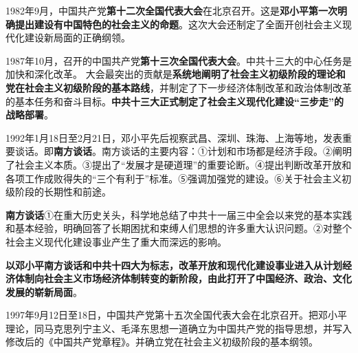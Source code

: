 1982年9月，中国共产党\textbf{第十二次全国代表大会}在北京召开。这是\textbf{邓小平第一次明确提出建设有中国特色的社会主义的命题}。这次大会还制定了全面开创社会主义现代化建设新局面的正确纲领。

1987年10月，召开的中国共产党\textbf{第十三次全国代表大会}。中共十三大的中心任务是加快和深化改革。
大会最突出的贡献是\textbf{系统地阐明了社会主义初级阶段的理论和党在社会主义初级阶段的基本路线}，并制定了下一步经济体制改革和政治体制改革的基本任务和奋斗目标。\textbf{中共十三大正式制定了社会主义现代化建设``三步走''的战略部署}。

1992年1月18日至2月21日，邓小平先后视察武昌、深圳、珠海、上海等地，发表重要谈话。即\textbf{{南方谈话}}。南方谈话的主要内容：①计划和市场都是经济手段。②阐明了社会主义本质。③提出了``发展才是硬道理''的重要论断。④提出判断改革开放和各项工作成败得失的``三个有利于''标准。⑤强调加强党的建设。⑥关于社会主义初级阶段的长期性和前途。

\textbf{{南方谈话}}①在重大历史关头，科学地总结了中共十一届三中全会以来党的基本实践和基本经验，明确回答了长期困扰和束缚人们思想的许多重大认识问题。②对整个社会主义现代化建设事业产生了重大而深远的影响。

\textbf{以邓小平南方谈话和中共十四大为标志，改革开放和现代化建设事业进入从计划经济体制向社会主义市场经济体制转变的新阶段，由此打开了中国经济、政治、文化发展的崭新局面}。

{1997年9月12日至18日，}中国共产党第十五次全国代表大会在北京召开{。}把邓小平理论，同马克思列宁主义、毛泽东思想一道确立为中国共产党的指导思想，并写入修改后的《中国共产党章程》{。并确立}党在社会主义初级阶段的基本纲领{。}
